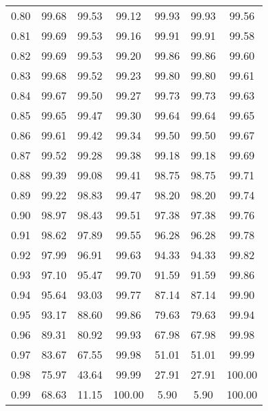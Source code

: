 \begin{tabular}{|c|c|c|c|c|c|c|}
      0.80 &     99.68 &     99.53 &      99.12 &   99.93 &      99.93 &         99.56 \\
      0.81 &     99.69 &     99.53 &      99.16 &   99.91 &      99.91 &         99.58 \\
      0.82 &     99.69 &     99.53 &      99.20 &   99.86 &      99.86 &         99.60 \\
      0.83 &     99.68 &     99.52 &      99.23 &   99.80 &      99.80 &         99.61 \\
      0.84 &     99.67 &     99.50 &      99.27 &   99.73 &      99.73 &         99.63 \\
      0.85 &     99.65 &     99.47 &      99.30 &   99.64 &      99.64 &         99.65 \\
      0.86 &     99.61 &     99.42 &      99.34 &   99.50 &      99.50 &         99.67 \\
      0.87 &     99.52 &     99.28 &      99.38 &   99.18 &      99.18 &         99.69 \\
      0.88 &     99.39 &     99.08 &      99.41 &   98.75 &      98.75 &         99.71 \\
      0.89 &     99.22 &     98.83 &      99.47 &   98.20 &      98.20 &         99.74 \\
      0.90 &     98.97 &     98.43 &      99.51 &   97.38 &      97.38 &         99.76 \\
      0.91 &     98.62 &     97.89 &      99.55 &   96.28 &      96.28 &         99.78 \\
      0.92 &     97.99 &     96.91 &      99.63 &   94.33 &      94.33 &         99.82 \\
      0.93 &     97.10 &     95.47 &      99.70 &   91.59 &      91.59 &         99.86 \\
      0.94 &     95.64 &     93.03 &      99.77 &   87.14 &      87.14 &         99.90 \\
      0.95 &     93.17 &     88.60 &      99.86 &   79.63 &      79.63 &         99.94 \\
      0.96 &     89.31 &     80.92 &      99.93 &   67.98 &      67.98 &         99.98 \\
      0.97 &     83.67 &     67.55 &      99.98 &   51.01 &      51.01 &         99.99 \\
      0.98 &     75.97 &     43.64 &      99.99 &   27.91 &      27.91 &        100.00 \\
      0.99 &     68.63 &     11.15 &     100.00 &    5.90 &       5.90 &        100.00 \\
\bottomrule
\end{tabular}
